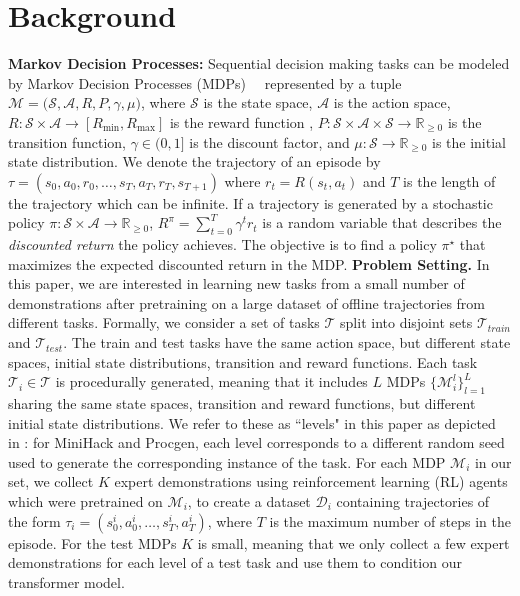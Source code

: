 \documentclass[]{fairmeta}
\def\gA{{\mathcal{A}}}
\def\gM{{\mathcal{M}}}
\def\gS{{\mathcal{S}}}
\def\sR{{\mathbb{R}}}
\def\gA{{\mathcal{A}}}
\def\gM{{\mathcal{M}}}
\def\gS{{\mathcal{S}}}
\def\sR{{\mathbb{R}}}
\begin{document}
\section{Background}
\textbf{Markov Decision Processes:}
Sequential decision making tasks can be modeled by
Markov Decision Processes (MDPs)~\citep{sutton2018reinforcement}~
represented by a tuple $\gM = \big( \gS, \gA, R, P, \gamma, \mu \big)$, where $\gS$ is the state space, $\gA$ is the action space, $R: \gS \times \gA \rightarrow [R_{\min}, R_{\max} ]$ is the reward function
, $P: \gS \times \gA \times \gS \rightarrow \sR_{\geq 0}$ is the transition function, $\gamma \in (0, 1]$ is the discount factor, and $\mu: \gS \rightarrow \sR_{\geq 0}$ is the initial state distribution. We denote the trajectory of an episode by $\tau = (s_0, a_0, r_0, \dots, s_T, a_T, r_T, s_{T+1})$ where $r_t = R(s_t, a_t)$ and $T$ is the length of the trajectory which can be infinite.
If a trajectory is generated by a stochastic policy $\pi: \gS \times \gA \rightarrow \sR_{\geq 0}$, $R^\pi = \sum_{t=0}^T \gamma^t r_t$ is a random variable that describes the \textit{discounted return} the policy achieves. The objective is to find a policy $\pi^\star$ that maximizes the expected discounted return in the MDP.
\textbf{Problem Setting.}
In this paper, we are interested in learning new tasks from a small number of demonstrations after pretraining on a large dataset of offline trajectories from different tasks. Formally, we consider a set of tasks $\mathcal{T}$ split into disjoint sets $\mathcal{T}_{train}$ and $\mathcal{T}_{test}$.
The train and test tasks have the same action space, but different state spaces, initial state distributions, transition and reward functions. Each task $\mathcal{T}_i \in \mathcal{T}$ is procedurally generated, meaning that it includes $L$ MDPs $\{\mathcal{M}_i^l\}_{l=1}^L$ sharing the same state spaces, transition and reward functions, but different initial state distributions. We refer to these as ``levels" in this paper as depicted in : for MiniHack and Procgen, each level corresponds to a different random seed used to generate the corresponding instance of the task. For each MDP $\mathcal{M}_i$ in our set, we collect $K$ expert demonstrations using reinforcement learning (RL) agents which were pretrained on $\mathcal{M}_i$, to create a dataset $\mathcal{D}_i$ containing trajectories of the form $\tau_i = (s_0^i, a_0^i, \ldots, s_T^i, a_T^i)$, where $T$ is the maximum number of steps in the episode. For the test MDPs $K$ is small, meaning that we only collect a few expert demonstrations for each level of a test task and use them to condition our transformer model.
\end{document}

